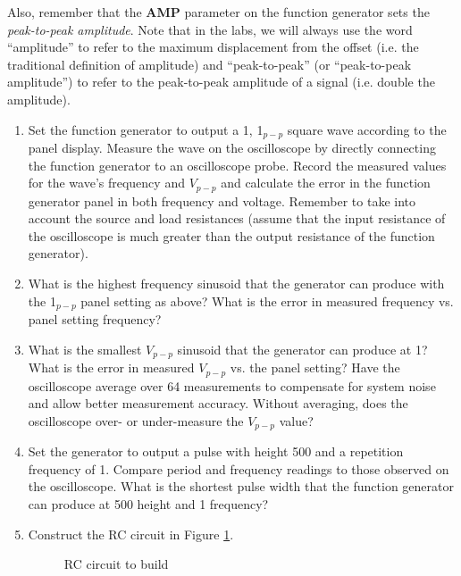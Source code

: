 \documentclass{article}
\begin{document}
Also, remember that the \textbf{AMP} parameter on the function generator sets the \textit{peak-to-peak amplitude}. Note that in the labs, we will always use the word ``amplitude'' to refer to the maximum displacement from the offset (i.e. the traditional definition of amplitude) and ``peak-to-peak'' (or ``peak-to-peak amplitude'') to refer to the peak-to-peak amplitude of a signal (i.e. double the amplitude).

\begin{enumerate}

\item Set the function generator to output a \unit{1}{\kilo\hertz}, \unit{1}{\volt}$_{p-p}$ square wave according to the panel display. Measure the wave on the oscilloscope by directly connecting the function generator to an oscilloscope probe. Record the measured values for the wave's frequency and $V_{p-p}$ and calculate the error in the function generator panel in both frequency and voltage. Remember to take into account the source and load resistances (assume that the input resistance of the oscilloscope is much greater than the output resistance of the function generator).

\item What is the highest frequency sinusoid that the generator can produce with the \unit{1}{\volt}$_{p-p}$ panel setting as above? What is the error in measured frequency vs. panel setting frequency?

\item What is the smallest $V_{p-p}$ sinusoid that the generator can produce at \unit{1}{\kilo\hertz}? What is the error in measured $V_{p-p}$ vs. the panel setting? Have the oscilloscope average over 64 measurements to compensate for system noise and allow better measurement accuracy. Without averaging, does the oscilloscope over- or under-measure the $V_{p-p}$ value?

\item Set the generator to output a pulse with height \unit{500}{\milli\volt} and a repetition frequency of \unit{1}{\kilo\hertz}. Compare period and frequency readings to those observed on the oscilloscope. What is the shortest pulse width that the function generator can produce at \unit{500}{\milli\volt} height and \unit{1}{\kilo\hertz} frequency?

\item Construct the RC circuit in Figure \ref{rc}.

	\begin{figure}[!htb]
		
		\centerline{\box\graph}
		\caption{RC circuit to build}
		\label{rc}
	\end{figure}


\end{enumerate}
\end{document}
